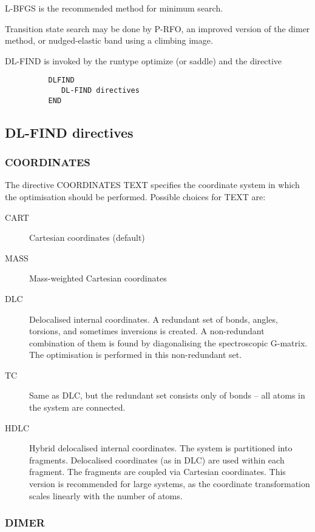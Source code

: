 \documentclass[11pt,fleqn]{article}
\begin{document}
L-BFGS is the recommended method for minimum search. 

Transition state search may be done by P-RFO, an improved version of the dimer
method, or nudged-elastic band using a climbing image.

DL-FIND is invoked by the runtype optimize (or saddle) and the directive
{
\footnotesize
\begin{verbatim}
          DLFIND
             DL-FIND directives
          END
\end{verbatim}
}



\subsection{DL-FIND directives}

\subsubsection{COORDINATES}

The directive COORDINATES TEXT specifies the coordinate system in which the
optimisation should be performed. Possible choices for TEXT are:
\begin{description}
\item[CART] Cartesian coordinates (default)
\item[MASS] Mass-weighted Cartesian coordinates
\item[DLC] Delocalised internal coordinates. A redundant set of bonds, angles,
  torsions, and sometimes inversions is created. A non-redundant combination
  of them is found by diagonalising the spectroscopic G-matrix. The
  optimisation is performed in this non-redundant set.
\item[TC] Same as DLC, but the redundant set consists only of bonds -- all
  atoms in the system are connected.
\item[HDLC] Hybrid delocalised internal coordinates. The system is
  partitioned into fragments. Delocalised coordinates (as in DLC) are used
  within each fragment. The fragments are coupled via Cartesian
  coordinates. This version is recommended for large systems, as the
  coordinate transformation scales linearly with the number of atoms.
\end{description}

\subsubsection{DIMER}
\end{document}
